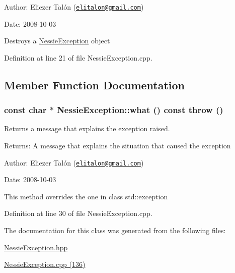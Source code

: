 \begin{Desc}
\item[Author:]Eliezer Talón (\href{mailto:elitalon@gmail.com}{\tt elitalon@gmail.com}) \end{Desc}
\begin{Desc}
\item[Date:]2008-10-03\end{Desc}
Destroys a \hyperlink{class_nessie_exception}{NessieException} object 

Definition at line 21 of file NessieException.cpp.

\subsection{Member Function Documentation}
\hypertarget{class_nessie_exception_a522c2ea164e88be0b26670170b33909}{
\subsubsection[what]{\setlength{\rightskip}{0pt plus 5cm}const char $\ast$ NessieException::what () const  throw ()}}
\label{class_nessie_exception_a522c2ea164e88be0b26670170b33909}


Returns a message that explains the exception raised. 

\begin{Desc}
\item[Returns:]A message that explains the situation that caused the exception\end{Desc}
\begin{Desc}
\item[Author:]Eliezer Talón (\href{mailto:elitalon@gmail.com}{\tt elitalon@gmail.com}) \end{Desc}
\begin{Desc}
\item[Date:]2008-10-03\end{Desc}
This method overrides the one in class std::exception 

Definition at line 30 of file NessieException.cpp.

The documentation for this class was generated from the following files:\begin{CompactItemize}
\item 
\hyperlink{_nessie_exception_8hpp}{NessieException.hpp}\item 
\hyperlink{_nessie_exception_8cpp}{NessieException.cpp (136)}\end{CompactItemize}
